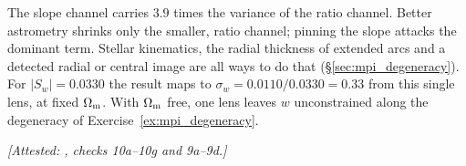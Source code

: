 The slope channel carries $3.9$ times the variance of the ratio channel.
Better astrometry shrinks only the smaller, ratio channel; pinning the
slope attacks the dominant term.  Stellar kinematics, the radial
thickness of extended arcs and a detected radial or central image are
all ways to do that (\S\ref{sec:mpi_degeneracy}).  For $|S_w|=0.0330$
the result maps to $\sigma_w=0.0110/0.0330=0.33$ from this single lens,
at fixed $\Omega_{\mathrm{m}}$.  With $\Omega_{\mathrm{m}}$ free, one lens leaves $w$
unconstrained along the degeneracy of
Exercise~\ref{ex:mpi_degeneracy}.

\emph{[Attested: ,
checks 10a--10g and 9a--9d.]}
